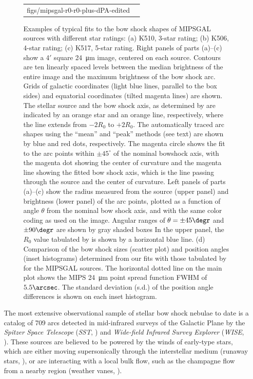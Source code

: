 \begin{figure}
\begin{tabular}{ll}
{      {figs/mipsgal-r0-r0-plus-dPA-edited}}
  \end{tabular}
  \caption[]{Examples of typical fits to the bow shock shapes of
    MIPSGAL sources with different star ratings: (a) K510, 3-star
    rating; (b) K506, 4-star rating; (c) K517, 5-star rating.  Right
    panels of parts (a)--(c) show a 4\('\) square \SI{24}{\um} image,
    centered on each source.  Contours are ten linearly spaced levels
    between the median brightness of the entire image and the maximum
    brightness of the bow shock arc. Grids of galactic coordinates
    (light blue lines, parallel to the box sides) and equatorial
    coordinates (tilted magenta lines) are shown.  The stellar source
    and the bow shock axis, as determined by \citet{Kobulnicky:2016a}
    are indicated by an orange star and an orange line, respectively,
    where the line extends from \(-2 R_0\) to \(+2 R_0\).  The
    automatically traced arc shapes using the ``mean'' and ``peak''
    methods (see text) are shown by blue and red dots, respectively.
    The magenta circle shows the fit to the arc points within
    \(\pm 45^\circ\) of the nominal bowshock axis, with the magenta dot
    showing the center of curvature and the magenta line showing the
    fitted bow shock axis, which is the line passing through the
    source and the center of curvature.  Left panels of parts (a)--(c)
    show the radius measured from the source (upper panel) and
    brightness (lower panel) of the arc points, plotted as a function
    of angle \(\theta\) from the nominal bow shock axis, and with the same
    color coding as used on the image. Angular ranges of
    \(\theta = \pm 45\degr\) and \(\pm 90\degr\) are shown by gray shaded
    boxes In the upper panel, the \(R_0\) value tabulated by
    \citet{Kobulnicky:2016a} is shown by a horizontal blue line. (d)
    Comparison of the bow shock sizes (scatter plot) and position
    angles (inset histograms) determined from our fits with those
    tabulated by \citet{Kobulnicky:2016a} for the MIPSGAL sources.
    The horizontal dotted line on the main plot shows the MIPS
    \SI{24}{\um} point spread function FWHM of \(5.5\arcsec\).  The
    standard deviation (s.d.) of the position angle differences is
    shown on each inset histogram.}
  \label{fig:mipsgal-examples}
\end{figure}


The most extensive observational sample of stellar bow shock nebulae
to date is a catalog of 709 arcs \citep{Kobulnicky:2016a} detected in
mid-infrared surveys of the Galactic Plane by the \textit{Spitzer
  Space Telescope} (\textit{SST}, \citealp{Werner:2004a}) and
\textit{Wide-field Infrared Survey Explorer} (\textit{WISE},
\citealp{Wright:2010a}).  These sources are believed to be powered by
the winds of early-type stars, which are either moving supersonically
through the interstellar medium (runaway stars,
\citealp{Gvaramadze:2008a}), or are interacting with a local bulk
flow, such as the champagne flow from a nearby \hii{} region (weather
vanes, \citealp{Povich:2008a}).


